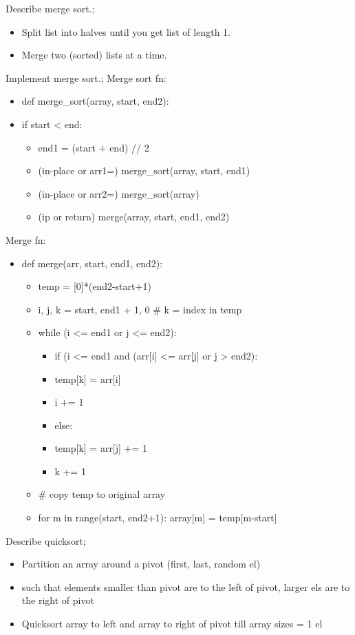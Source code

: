 \documentclass{article}
\begin{document}
Describe merge sort.; \begin{itemize} \item Split list into halves until you get list of length 1. \item Merge two (sorted) lists at a time. \end{itemize}

Implement merge sort.; Merge sort fn: \begin{itemize} \item def merge\_sort(array, start, end2): \item if start < end: \begin{itemize} \item 	end1 = (start + end) // 2 \item (in-place or arr1=) merge\_sort(array, start, end1) \item (in-place or arr2=) merge\_sort(array) \item (ip or return) merge(array, start, end1, end2) \end{itemize} \end{itemize} Merge fn: \begin{itemize} \item def merge(arr, start, end1, end2): \begin{itemize} \item temp = [0]*(end2-start+1) \item i, j, k = start, end1 + 1, 0 # k = index in temp \item  while (i <= end1 or j <= end2): \begin{itemize} \item if (i <= end1 and (arr[i] <= arr[j] or j > end2): \item temp[k] = arr[i] \item i += 1 \item else: \item temp[k] = arr[j] \itemj += 1 \item k += 1 \end{itemize} \item # copy temp to original array \item for m in range(start, end2+1): array[m] = temp[m-start] \end{itemize} \end{itemize}

Describe quicksort; \begin{itemize} \item Partition an array around a pivot (first, last, random el) \item such that elements smaller than pivot are to the left of pivot, larger els are to the right of pivot \item Quicksort array to left and array to right of pivot till array sizes = 1 el \end{itemize}
\end{document}
